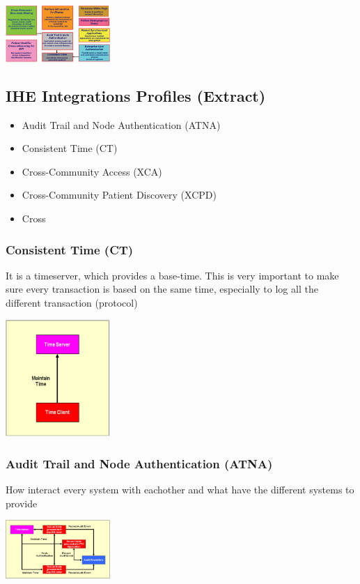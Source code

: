 \documentclass{report}
\newenvironment{Figure}
	{\par\medskip\noindent\minipage{\linewidth}}
	{\endminipage\par\medskip}
\theoremstyle{definition}
\theoremstyle{example}
\begin{document}
\begin{Figure}
   \centering
    \includegraphics[width=150px]{img/ITI.png}
        \label{fig:IHE IT Infrastructure Integration Profiles}
\end{Figure}

\subsection{IHE Integrations Profiles (Extract)}
\begin{itemize}
   \item Audit Trail and Node Authentication (ATNA)
   \item Consistent Time (CT)
   \item Cross-Community Access (XCA)
   \item Cross-Community Patient Discovery (XCPD)
   \item Cross
\end{itemize}

\subsubsection{Consistent Time (CT)}
It is a timeserver, which provides a base-time. This is very important to make sure every transaction is based on the same time, especially to log all the different transaction (protocol) 
\begin{Figure}
   \centering
    \includegraphics[width=150px]{img/CT.png}
        \label{fig:Workflow from CT}
\end{Figure}

\subsubsection{Audit Trail and Node Authentication (ATNA)}
How interact every system with eachother and what have the different systems to provide
\begin{Figure}
   \centering
    \includegraphics[width=150px]{img/ATNA.png}
        \label{fig:Workflow from ATNA}
\end{Figure}
\end{document}
